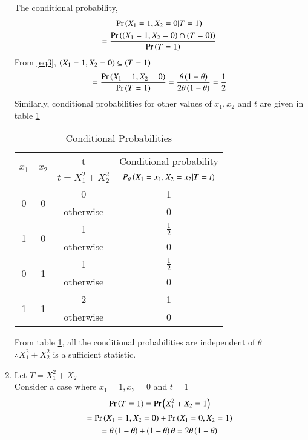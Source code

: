 \documentclass[journal,12pt,twocolumn]{IEEEtran}
\begin{document}
\begin{enumerate}
    The conditional probability,
    \begin{multline}
        \Pr\left(X_1=1,X_2=0 | T=1\right)\\
        =\frac{\Pr\left(\left(X_1=1,X_2=0\right)\cap\left(T=0\right)\right)}{\Pr\left(T=1\right)}
    \end{multline}
    From \eqref{eq3}, $\left(X_1=1,X_2=0\right) \subseteq \left(T=1\right)$
    \begin{multline}
        =\frac{\Pr\left(X_1=1,X_2=0\right)}{\Pr\left(T=1\right)}=\frac{\theta\left(1-\theta\right)}{2\theta\left(1-\theta\right)}=\frac{1}{2}
    \end{multline}
    Similarly, conditional probabilities for other values of $x_1,x_2$ and $t$ are given in table \ref{table2}
    \begin{table}[h!]
    \begin{tabular}[width=\columnwidth]{|c|c|c|c|}
         \hline
        \multirow{2}{*}{$x_1$} & \multirow{2}{*}{$x_2$} & t & Conditional probability\\
        & & $t=X_1^2+X_2^2$ & $P_\theta\left(X_1=x_1,X_2=x_2|T=t\right)$\\
        \hline
        \multirow{2}{*}{0} & \multirow{2}{*}{0} & 0 & 1\\ 
        & & otherwise & 0 \\ 
        \hline
        \multirow{2}{*}{1} & \multirow{2}{*}{0} & 1 & $\frac{1}{2}$\\ 
        & & otherwise & 0 \\ 
        \hline
        \multirow{2}{*}{0} & \multirow{2}{*}{1} & 1 & $\frac{1}{2}$\\ 
        & & otherwise & 0 \\ 
        \hline
        \multirow{2}{*}{1} & \multirow{2}{*}{1} & 2 & 1\\ 
        & & otherwise & 0 \\        
        \hline
    \end{tabular}
    \caption{Conditional Probabilities}
    \label{table2}
    \end{table}  
    
    From table \ref{table2}, all the conditional probabilities are independent of $\theta$\\ $\therefore X_1^2+X_2^2$ is a sufficient statistic.
    
    \item Let $T=X_1^2+X_2$\\
    Consider a case where $x_1=1, x_2=0$ and $t=1$
    \begin{multline}
        \label{eq4}\Pr\left(T=1\right)=\Pr\left(X_1^2+X_2=1\right)\\=\Pr\left(X_1=1,X_2=0\right)+\Pr\left(X_1=0,X_2=1\right)\\=\theta \left(1-\theta\right) + \left(1-\theta\right)\theta  = 2\theta \left(1-\theta\right)
    \end{multline}


\end{enumerate}
\end{document}
